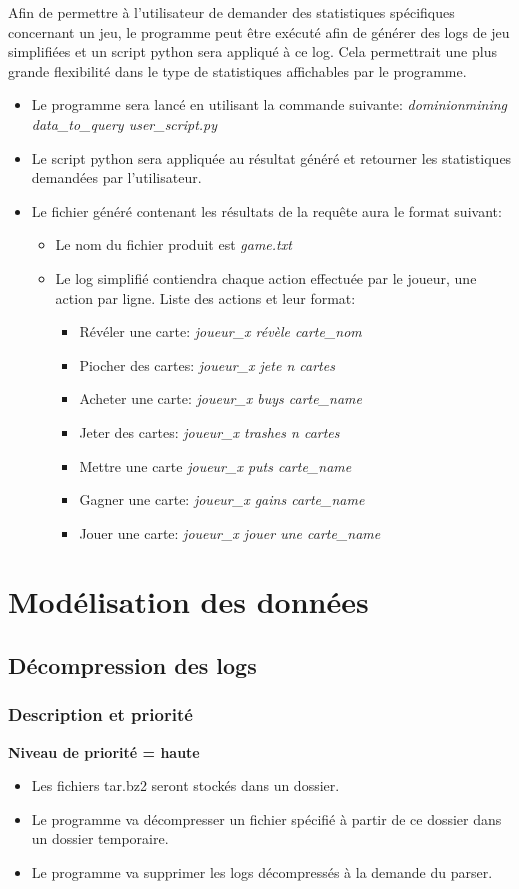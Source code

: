 \documentclass{scrreprt}
\begin{document}
Afin de permettre à l'utilisateur de demander des statistiques spécifiques concernant un jeu, le programme peut être exécuté afin de générer des logs de jeu simplifiées et un script python sera appliqué à ce log. Cela permettrait une plus grande flexibilité dans le type de statistiques affichables par le programme.
\begin{itemize}
\item Le programme sera lancé en utilisant la commande suivante: \textit{dominionmining data\_to\_query user\_script.py}
 \item Le script python sera appliquée au résultat généré et retourner les statistiques demandées par l'utilisateur.
\item Le fichier généré contenant les résultats de la requête aura le format suivant:
\begin{itemize}
\item Le nom du fichier produit est \textit{game.txt}
\item Le log simplifié contiendra chaque action effectuée par le joueur, une action par ligne. Liste des actions et leur format:
\begin{itemize}
\item Révéler une carte: \textit{joueur\_x révèle carte\_nom}
\item Piocher des cartes: \textit{joueur\_x jete n cartes}
\item Acheter une carte: \textit{joueur\_x buys carte\_name}
\item Jeter des cartes: \textit{joueur\_x trashes n cartes}
\item Mettre une carte \textit{joueur\_x puts carte\_name}
\item Gagner une carte: \textit{joueur\_x gains carte\_name}
\item Jouer une carte: \textit{joueur\_x jouer une carte\_name}

\end{itemize}
\end{itemize}
\end{itemize}
\fi
\section{Modélisation des données}

\subsection{Décompression des logs}
\subsubsection{Description et priorité}
\textbf{Niveau de priorité = haute}\\
\begin{itemize}
  \item Les fichiers tar.bz2 seront stockés dans un dossier.
  \item Le programme va  décompresser un fichier spécifié à partir de ce dossier dans un dossier temporaire.
  \item Le programme va  supprimer les logs décompressés  à la demande du parser.
\end{itemize}
\end{document}
